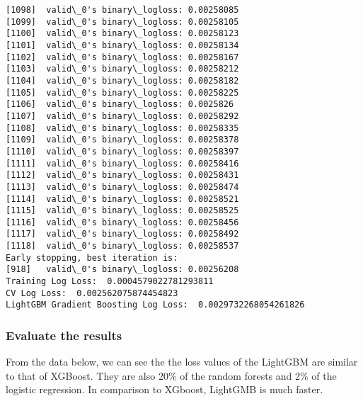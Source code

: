 \documentclass[11pt]{article}
\begin{document}
\begin{Verbatim}[commandchars=\\\{\}]
[1098]	valid\_0's binary\_logloss: 0.00258085
[1099]	valid\_0's binary\_logloss: 0.00258105
[1100]	valid\_0's binary\_logloss: 0.00258123
[1101]	valid\_0's binary\_logloss: 0.00258134
[1102]	valid\_0's binary\_logloss: 0.00258167
[1103]	valid\_0's binary\_logloss: 0.00258212
[1104]	valid\_0's binary\_logloss: 0.00258182
[1105]	valid\_0's binary\_logloss: 0.00258225
[1106]	valid\_0's binary\_logloss: 0.0025826
[1107]	valid\_0's binary\_logloss: 0.00258292
[1108]	valid\_0's binary\_logloss: 0.00258335
[1109]	valid\_0's binary\_logloss: 0.00258378
[1110]	valid\_0's binary\_logloss: 0.00258397
[1111]	valid\_0's binary\_logloss: 0.00258416
[1112]	valid\_0's binary\_logloss: 0.00258431
[1113]	valid\_0's binary\_logloss: 0.00258474
[1114]	valid\_0's binary\_logloss: 0.00258521
[1115]	valid\_0's binary\_logloss: 0.00258525
[1116]	valid\_0's binary\_logloss: 0.00258456
[1117]	valid\_0's binary\_logloss: 0.00258492
[1118]	valid\_0's binary\_logloss: 0.00258537
Early stopping, best iteration is:
[918]	valid\_0's binary\_logloss: 0.00256208
Training Log Loss:  0.0004579022781293811
CV Log Loss:  0.002562075874454823
LightGBM Gradient Boosting Log Loss:  0.0029732268054261826

    \end{Verbatim}

    \subsubsection{Evaluate the results}\label{evaluate-the-results}

From the data below, we can see the the loss values of the LightGBM are
similar to that of XGBoost. They are also 20\% of the random forests and
2\% of the logistic regression. In comparison to XGboost, LightGMB is
much faster.
\end{document}
